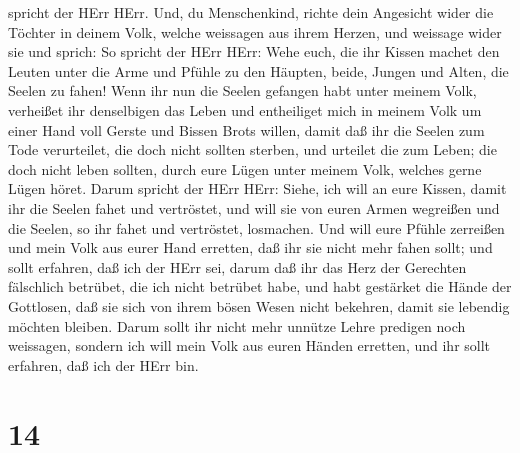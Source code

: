 spricht der HErr HErr.  Und, du Menschenkind, richte dein
Angesicht wider die Töchter in deinem Volk, welche weissagen aus ihrem
Herzen, und weissage wider sie  und sprich: So spricht der
HErr HErr: Wehe euch, die ihr Kissen machet den Leuten unter die Arme
und Pfühle zu den Häupten, beide, Jungen und Alten, die Seelen zu fahen!
Wenn ihr nun die Seelen gefangen habt unter meinem Volk, verheißet ihr
denselbigen das Leben  und entheiliget mich in meinem Volk
um einer Hand voll Gerste und Bissen Brots willen, damit daß ihr die
Seelen zum Tode verurteilet, die doch nicht sollten sterben, und
urteilet die zum Leben; die doch nicht leben sollten, durch eure Lügen
unter meinem Volk, welches gerne Lügen höret.  Darum
spricht der HErr HErr: Siehe, ich will an eure Kissen, damit ihr die
Seelen fahet und vertröstet, und will sie von euren Armen wegreißen und
die Seelen, so ihr fahet und vertröstet, losmachen.  Und
will eure Pfühle zerreißen und mein Volk aus eurer Hand erretten, daß
ihr sie nicht mehr fahen sollt; und sollt erfahren, daß ich der HErr
sei,  darum daß ihr das Herz der Gerechten fälschlich
betrübet, die ich nicht betrübet habe, und habt gestärket die Hände der
Gottlosen, daß sie sich von ihrem bösen Wesen nicht bekehren, damit sie
lebendig möchten bleiben.  Darum sollt ihr nicht mehr
unnütze Lehre predigen noch weissagen, sondern ich will mein Volk aus
euren Händen erretten, und ihr sollt erfahren, daß ich der HErr bin.

\hypertarget{section-13}{%
\section{14}\label{section-13}}

